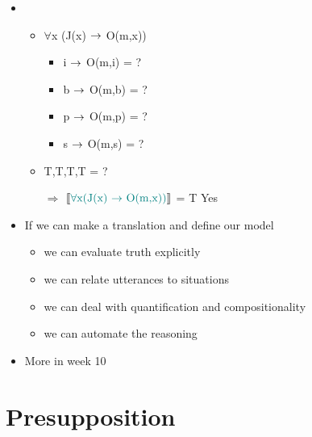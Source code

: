 \documentclass[headrule,footrule]{foils}
\newcommand{\den}[2][]{\ensuremath{\llbracket\textnormal{\textcolor{teal}{#2}}\rrbracket^{\ensuremath{#1}}}}
\begin{document}

\begin{itemize}
\item {}
  \begin{itemize}
  \item $\forall$x (J(x) $\into$ O(m,x))
    \begin{itemize}
    \item i $\into$ O(m,i) = ?
    \item b $\into$ O(m,b) = ?
    \item p $\into$ O(m,p) = ?
    \item s $\into$ O(m,s) = ?
    \end{itemize}
  \item T,T,T,T  = ?
  \item[$\Rightarrow$] \den{ $\forall$x(J(x) $\into$ O(m,x))} = T  \hfill Yes
  \end{itemize}
\end{itemize}



\begin{itemize}
\item If we can make a translation and define our model
  \begin{itemize}
  \item we can evaluate truth explicitly
  \item we can relate utterances to situations
  \item we can deal with quantification and compositionality
  \item we can automate the reasoning
  \end{itemize}
\item More in week 10
\end{itemize}



\section{Presupposition}

\end{document}
